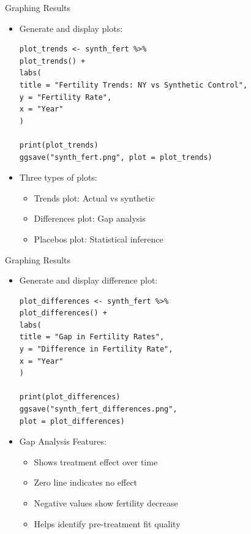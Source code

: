 \documentclass[dvipsnames,hyperref={pdfpagelabels=false}]{beamer}
\begin{document}
\begin{frame}[fragile]{Graphing Results}
\begin{itemize}
\item Generate and display plots:
\vspace{0.2cm}
\begin{lstlisting}
plot_trends <- synth_fert %>%
plot_trends() +
labs(
title = "Fertility Trends: NY vs Synthetic Control",
y = "Fertility Rate",
x = "Year"
)

print(plot_trends)  
ggsave("synth_fert.png", plot = plot_trends)
\end{lstlisting}
\item Three types of plots:
\begin{itemize}
\item Trends plot: Actual vs synthetic
\item Differences plot: Gap analysis
\item Placebos plot: Statistical inference
\end{itemize}
\end{itemize}
\end{frame}


\begin{frame}[fragile]{Graphing Results}
\begin{itemize}
	\item Generate and display difference plot:
	\vspace{0.2cm}
\begin{lstlisting}
plot_differences <- synth_fert %>%
plot_differences() +
labs(
title = "Gap in Fertility Rates",
y = "Difference in Fertility Rate",
x = "Year"
)

print(plot_differences)
ggsave("synth_fert_differences.png", 
plot = plot_differences)
\end{lstlisting}
	\item Gap Analysis Features:
	\begin{itemize}
		\item Shows treatment effect over time
		\item Zero line indicates no effect
		\item Negative values show fertility decrease
		\item Helps identify pre-treatment fit quality
	\end{itemize}
\end{itemize}
\end{frame}
\end{document}

